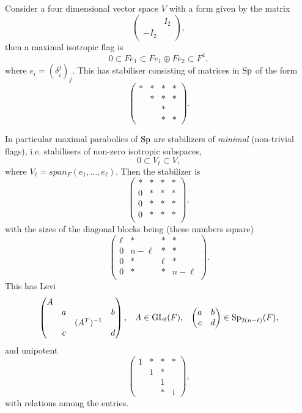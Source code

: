 \begin{example}
        Consider a four dimensional vector space \(V\) with a form given by the matrix
        \[\begin{pmatrix}
            & I_2 \\
            -I_2 & 
        \end{pmatrix},\]
        then a maximal isotropic flag is 
        \[0 \subset Fe_1 \subset Fe_1 \oplus Fe_2 \subset F^4,\]
        where \(e_i = (\delta_i^j)_j\). This has stabiliser consisting of matrices in \(\operatorname{Sp}\) of the form
        \[\begin{pmatrix}
            *&*&*&* \\
             &*&*&* \\
             && *& \\
             && *& *
        \end{pmatrix}.\]
    \end{example}

\vspace{5mm}
    \label{maximal_parabolic}
    In particular maximal parabolics of \(\operatorname{Sp}\) are stabilizers of \textit{minimal} (non-trivial flags), i.e. stabilisers of non-zero isotropic subspaces,
    \[0 \subset V_\ell \subset V,\]
    where \(V_\ell = span_F(e_1, ..., e_\ell)\). Then the stabilizer is 
    \[\begin{pmatrix}
        * &*&*&* \\
        0 &*&*&* \\
        0 &*&*&* \\
        0 &*&*&* \\
    \end{pmatrix},\]
    with the sizes of the diagonal blocks being (these numbers square)
    \[\begin{pmatrix}
        \ell &*&*&* \\
        0 &n-\ell&*&* \\
        0 &*&\ell&* \\
        0 &*&*&n-\ell \\
    \end{pmatrix}.\]
    This has Levi
    \[\begin{pmatrix}
        A &&& \\
         &a&&b \\
         &&(A^T)^{-1}& \\
         &c&&d \\
    \end{pmatrix}, \;\;\; A\in \operatorname{GL}_\ell(F), \;\;\; \begin{pmatrix}
        a & b\\
        c & d \\
    \end{pmatrix} \in \operatorname{Sp}_{2(n-\ell)}(F),\]
    and unipotent 
    \[\begin{pmatrix}
        1 &*&*&* \\
        & 1&*& \\
        && 1& \\
        &&*&1
    \end{pmatrix},\]
    with relations among the entries.

